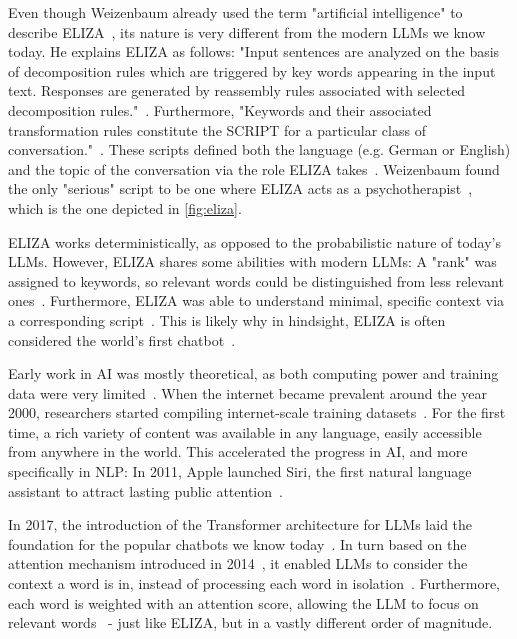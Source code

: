 Even though Weizenbaum already used the term "artificial intelligence" to describe ELIZA~\cite{weizenbaumELIZAComputerProgram1966}, its nature is very different from the modern \glspl{LLM} we know today. He explains ELIZA as follows: "Input sentences are analyzed on the basis of decomposition rules which are triggered by key words appearing in the input text. Responses are generated by reassembly rules associated with selected decomposition rules."~\cite{weizenbaumELIZAComputerProgram1966}. Furthermore, "Keywords and their associated transformation rules constitute the SCRIPT for a particular class of conversation."~\cite{weizenbaumELIZAComputerProgram1966}. These scripts defined both the language (e.g. German or English) and the topic of the conversation via the role ELIZA takes~\cite{weizenbaumELIZAComputerProgram1966}. Weizenbaum found the only "serious" script to be one where ELIZA acts as a psychotherapist~\cite{weizenbaumELIZAComputerProgram1966}, which is the one depicted in \cref{fig:eliza}.

ELIZA works deterministically, as opposed to the probabilistic nature of today's \glspl{LLM}. However, ELIZA shares some abilities with modern \glspl{LLM}: A "rank" was assigned to keywords, so relevant words could be distinguished from less relevant ones~\cite{weizenbaumELIZAComputerProgram1966}. Furthermore, ELIZA was able to understand minimal, specific context via a corresponding script~\cite{weizenbaumELIZAComputerProgram1966}. This is likely why in hindsight, ELIZA is often considered the world's first chatbot~\cite{berryLimitsComputationJoseph2023,shragerELIZAReinterpretedWorlds2024,wangELIZAChatGPTBrief2024}.

Early work in \gls{AI} was mostly theoretical, as both computing power and training data were very limited~\cite{shragerELIZAReinterpretedWorlds2024}. When the internet became prevalent around the year 2000, researchers started compiling internet-scale training datasets~\cite{bankoScalingVeryVery2001,resnikWebParallelCorpus2003,kilgarriffIntroductionSpecialIssue2003}. For the first time, a rich variety of content was available in any language, easily accessible from anywhere in the world. This accelerated the progress in \gls{AI}, and more specifically in \gls{NLP}: In 2011, Apple launched Siri, the first natural language assistant to attract lasting public attention~\cite{wangELIZAChatGPTBrief2024}.

In 2017, the introduction of the Transformer architecture for \glspl{LLM} laid the foundation for the popular chatbots we know today~\cite{vaswaniAttentionAllYou2023}. In turn based on the attention mechanism introduced in 2014~\cite{bahdanauNeuralMachineTranslation2016}, it enabled \glspl{LLM} to consider the context a word is in, instead of processing each word in isolation~\cite{vaswaniAttentionAllYou2023,bahdanauNeuralMachineTranslation2016}. Furthermore, each word is weighted with an attention score, allowing the \gls{LLM} to focus on relevant words~\cite{vaswaniAttentionAllYou2023,bahdanauNeuralMachineTranslation2016} - just like ELIZA, but in a vastly different order of magnitude.

